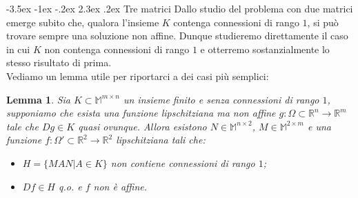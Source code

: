 \documentclass[a4paper,11pt]{book}
\makeatletter
\theoremstyle{plain}
\newtheorem{lemma}[teo]{Lemma}
\theoremstyle{definition}
\theoremstyle{remark}
\newcommand{\R}{\mathbb{R}}
\newcommand{\M}{\mathbb{M}}
\renewcommand\section{\@startsection {section}{1}{\z@}%
                                   {-3.5ex \@plus -1ex \@minus -.2ex}%
                                   {2.3ex \@plus.2ex}%
                                   {\normalfont\Large\bfseries}}
\makeatother
\begin{document}
\section{Tre matrici}
Dallo studio del problema con due matrici emerge subito che, qualora l'insieme $K$ contenga connessioni di rango $1$, si può trovare sempre una soluzione non affine. Dunque studieremo direttamente il caso in cui $K$ non contenga connessioni di rango $1$ e otterremo sostanzialmente lo stesso risultato di prima.\\
Vediamo un lemma utile per riportarci a dei casi più semplici:
\begin{lemma}\label{lemma:1}%
	Sia $K\subset \M^{m\times n}$ un insieme finito e senza connessioni di rango $1$, supponiamo che esista una funzione lipschitziana ma non affine $g:\Omega\subset\R^n\to\R^m$ tale che $Dg\in K$ quasi ovunque. Allora esistono $N\in \M^{n\times 2}$, $M\in \M^{2\times m}$ e una funzione $f:\Omega'\subset\R^2\to \R^2$ lipschitziana tali che:
	\begin{itemize}
		\item $H=\{MAN|A\in K\}$ non contiene connessioni di rango $1$;
		\item $Df\in H$ q.o. e $f$ non è affine.
	\end{itemize}
\end{lemma}
\end{document}
